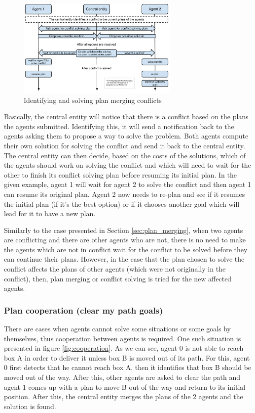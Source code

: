 \begin{figure}[htb]
\begin{center}
 \includegraphics[width=0.7\textwidth]{figures/conflict_solving.pdf}
 \caption{Identifying and solving plan merging conflicts}
 \label{fig:conflict_solving}
\end{center}
\end{figure} 

Basically, the central entity will notice that there is a conflict based on the plans the agents submitted.
Identifying this, it will send a notification back to the agents asking them to propose a way to solve the
problem. Both agents compute their own solution for solving the conflict and send it back to the central
entity. The central entity can then decide, based on the costs of the solutions, which of the agents should
work on solving the conflict and which will need to wait for the other to finish its conflict solving plan
before resuming its initial plan. In the given example, agent 1 will wait for agent 2 to solve the conflict
and then agent 1 can resume its original plan. Agent 2 now needs to re-plan and see if it resumes the initial
plan (if it’s the best option) or if it chooses another goal which will lead for it to have a new plan.

Similarly to the case presented in Section \ref{sec:plan_merging}, when two agents are conflicting and there
are other agents who are not, there is no need to make the agents which are not in conflict wait for the
conflict to be solved before they can continue their plans. However, in the case that the plan chosen to solve
the conflict affects the plans of other agents (which were not originally in the conflict), then, plan merging
or conflict solving is tried for the new affected agents.

\subsubsection{Plan cooperation (clear my path goals)}
There are cases when agents cannot solve some situations or some goals by themselves, thus cooperation between agents is required. One such situation is presented in figure \ref{fig:cooperation}. As we can see, agent 0 is not able to reach box A in order to deliver it unless box B is moved out of its path. For this, agent 0 first detects that he cannot reach box A, then it identifies that box B should be moved out of the way. After this, other agents are asked to clear the path and agent 1 comes up with a plan to move B out of the way and return to its initial position. After this, the central entity merges the plans of the 2 agents and the solution is found.

